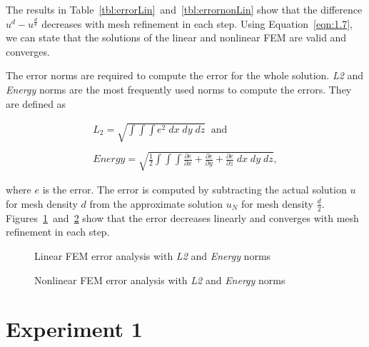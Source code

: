 The results in Table~\ref{tbl:errorLin}~and~\ref{tbl:errornonLin} show that the difference $u^d - u^{\frac{d}{8}}$ decreases with mesh refinement in each step. Using Equation~\ref{eqn:1.7}, we can state that the solutions of the linear and nonlinear FEM are valid and converges.


The error norms are required to compute the error for the whole solution. \textit{L2} and \textit{Energy} norms are the most frequently used norms to compute the errors. They are defined as

\begin{equation}
\begin{array}{l}
L_{2} = \sqrt{\int\int\int e^2 \; dx \; dy \; dz} \;\;\text{and} \\
\\
Energy = \sqrt{ \frac{1}{2} \int\int\int \frac{\partial{e}}{\partial{x}} + \frac{\partial{e}}{\partial{y}} + \frac{\partial{e}}{\partial{z}} \;  dx \; dy \; dz},
\end{array}
\label{eqn:norms}
\end{equation}

\noindent where $e$ is the error. The error is computed by subtracting the actual solution $u$ for mesh density $d$ from the approximate solution $u_{N}$ for mesh density $\frac{d}{2}$. Figures~\ref{fig:errlinnorm}~and~\ref{fig:errnonlinnorm} show that the error decreases linearly and converges with mesh refinement in each step.


\begin{figure}
\centerline{}
\caption{Linear FEM error analysis with \textit{L2} and \textit{Energy} norms}
\label{fig:errlinnorm}
\end{figure}

\begin{figure}
\centerline{}
\caption{Nonlinear FEM error analysis with \textit{L2} and \textit{Energy} norms}
\label{fig:errnonlinnorm}
\end{figure}


\clearpage
\section{Experiment 1}
\label{i}

